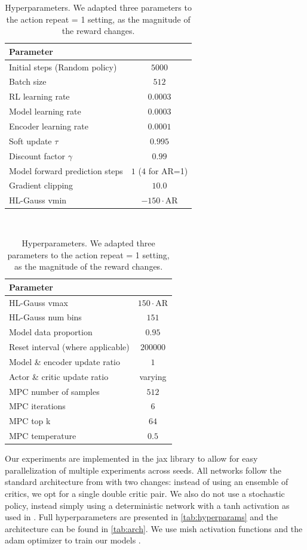 \begin{table}[t]
    \begin{tabular}{l|c}
        Parameter & \\\hline 
        Initial steps (Random policy) & $5000$  \\
        Batch size & $512$ \\
        RL learning rate & $0.0003$ \\
        Model learning rate & $0.0003$ \\
        Encoder learning rate & $0.0001$ \\
        Soft update $\tau$  & $0.995$ \\
        Discount factor $\gamma$  & $0.99$\\
        Model forward prediction steps & $1$ ($4$ for AR=1) \\
        Gradient clipping &  $10.0$ \\
        HL-Gauss vmin& $-150 \cdot \mathrm{AR}$ \\
    \end{tabular}
~
    \begin{tabular}{l|c}
        Parameter & \\\hline 
        HL-Gauss vmax& $150 \cdot \mathrm{AR}$\\ 
        HL-Gauss num bins& $151$\\
        Model data proportion& $0.95$\\
        Reset interval (where applicable)& $200000$\\
        Model \& encoder update ratio & $1$ \\
        Actor \& critic update ratio & varying \\
        MPC number of samples & $512$ \\
        MPC iterations& $6$ \\
        MPC top k& $64$\\
        MPC temperature& $0.5$
    \end{tabular}
    \caption{Hyperparameters. We adapted three parameters to the action repeat = 1 setting, as the magnitude of the reward changes.}
    \label{tab:hyperparams}
\end{table}

Our experiments are implemented in the jax library to allow for easy parallelization of multiple experiments across seeds.
All networks follow the standard architecture from \textcite{hansen2024tdmpc} with two changes: instead of using an ensemble of critics, we opt for a single double critic pair.
We also do not use a stochastic policy, instead simply using a deterministic network with a tanh activation as used in \textcite{ddpg,fujimoto2018addressing}.
Full hyperparameters are presented in \autoref{tab:hyperparams} and the architecture can be found in \autoref{tab:arch}.
We use mish activation functions \parencite{misra2020mish} and the adam optimizer to train our models \parencite{kingma2015adam}.

